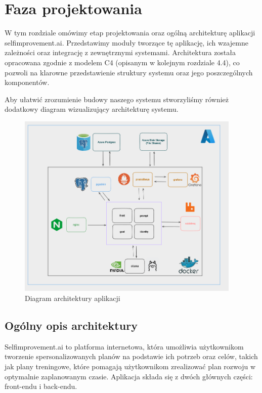 \section{Faza projektowania}
W tym rozdziale omówimy etap projektowania oraz ogólną architekturę aplikacji selfimprovement.ai. Przedstawimy moduły tworzące tę aplikację, ich wzajemne zależności oraz integrację z zewnętrznymi systemami. Architektura została opracowana zgodnie z modelem C4 (opisanym w kolejnym rozdziale 4.4), co pozwoli na klarowne przedstawienie struktury systemu oraz jego poszczególnych komponentów.

Aby ułatwić zrozumienie budowy naszego systemu stworzyliśmy również dodatkowy diagram wizualizujący architekturę systemu.

\begin{figure}[H]
    \centering
    \includegraphics[width=0.95\textwidth]{Obrazy/architecture.png}
    \caption{Diagram architektury aplikacji}
    \label{fig:my_label}
\end{figure}

\subsection{Ogólny opis architektury}
Selfimprovement.ai to platforma internetowa, która umożliwia użytkownikom tworzenie spersonalizowanych planów na podstawie ich potrzeb oraz celów, takich jak plany treningowe, które pomagają użytkownikom zrealizować plan rozwoju w optymalnie zaplanowanym czasie. Aplikacja składa się z dwóch głównych części: front-endu i back-endu.

